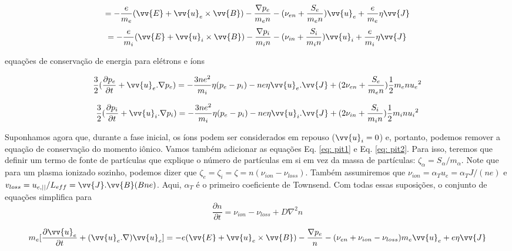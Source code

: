 \documentclass[12pt,oneside,a4paper]{abntex2}
\theoremstyle{definition}  %
\begin{document}
\begin{equation}
[\frac{\partial \vv{u}_e}{\partial t} + (\vv{u}_e . \nabla)\vv{u}_e] = - \frac{e}{m_e} (\vv{E}+\vv{u}_e \times \vv{B}) - \frac{\nabla p_e}{m_e n} - (\nu_{en}+\frac{S_e}{m_e n})\vv{u}_e + \frac{e}{m_e}\eta \vv{J} 
\end{equation}
\begin{equation}
[\frac{\partial \vv{u}_i}{\partial t} + (\vv{u}_i . \nabla)\vv{u}_i] = - \frac{e}{m_i} (\vv{E}+\vv{u}_i \times \vv{B}) - \frac{\nabla p_i}{m_i n} - (\nu_{in}+\frac{S_i}{m_i n})\vv{u}_i + \frac{e}{m_i}\eta \vv{J} 
\end{equation}
\begin{center}
{\large equações de conservação de energia para elétrons e íons}
\end{center}
\begin{equation}
\frac{3}{2} (\frac{\partial p_e}{\partial t} + \vv{u}_e . \nabla p_e) = -\frac{3ne^2}{m_i} \eta(p_e-p_i)-ne\eta \vv{u}_e.\vv{J}+(2 \nu_{en} + \frac{S_e}{m_e n} )\frac{1}{2}m_en{u_e}^2
\end{equation}

\begin{equation}
\frac{3}{2} (\frac{\partial p_i}{\partial t} + \vv{u}_i . \nabla p_i) = -\frac{3ne^2}{m_i} \eta(p_e-p_i)-ne\eta \vv{u}_i.\vv{J}+(2 \nu_{in} + \frac{S_i}{m_i n} )\frac{1}{2}m_in{u_i}^2
\end{equation}

Suponhamos agora que, durante a fase inicial, os íons podem ser considerados em repouso ($\vv{u}_i = 0$) e, portanto, podemos remover a equação de conservação do momento iônico. Vamos também adicionar as equações Eq. \ref{eq: pit1} e Eq. \ref{eq: pit2}. Para isso, teremos que definir um termo de fonte de partículas que explique o número de partículas em si em vez da massa de partículas: $\zeta_\alpha = S_\alpha / m_\alpha$. Note que para um plasma ionizado sozinho, podemos dizer que $\zeta_e = \zeta_i = \zeta = n(\nu_{ion} - \nu_{loss})$. Também assumiremos que $\nu_{ion} = \alpha_T u_e = \alpha_T J / (ne)$ e $v_{loss} = u_{e, ||} / L_{eff} = \vv{J}.\vv{B} (Bne)$. Aqui, $\alpha_T$ é o primeiro coeficiente de Townsend. Com todas essas suposições, o conjunto de equações simplifica para
\begin{equation}
\frac{\partial n}{\partial t} = \nu_{ion} - \nu_{loss}+D\nabla^2n
\end{equation}

\begin{equation}
m_e[\frac{\partial \vv{u}_e}{\partial t} + (\vv{u}_e . \nabla)\vv{u}_e] = - e (\vv{E}+\vv{u}_e \times \vv{B}) - \frac{\nabla p_e}{n} -(\nu_{en}+\nu_{ion}-\nu_{loss})m_e \vv{u}_e+ e\eta \vv{J} 
\end{equation}
\end{document}
